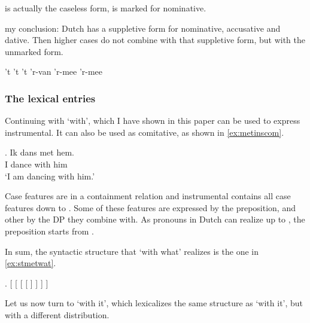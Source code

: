 \documentclass[12pt]{article}
\begin{document}
 is actually the caseless form,  is marked for nominative.


my conclusion: Dutch has a suppletive form for nominative, accusative and dative. Then higher cases do not combine with that suppletive form, but with the unmarked form.

't
't
't
'r-van
'r-mee
'r-mee



\subsubsection{The lexical entries}



Continuing with  `with', which I have shown in this paper can be used to express instrumental. It can also be used as comitative, as shown in \ref{ex:metinscom}.

\exg. Ik dans met hem.\\
 I dance with him\\
 `I am dancing with him.'\label{ex:metinscom}

Case features are in a containment relation and instrumental contains all case features down to . Some of these features are expressed by the preposition, and other by the DP they combine with. As pronouns in Dutch can realize up to , the preposition starts from .


In sum, the syntactic structure that  `with what' realizes is the one in \ref{ex:stmetwat}.

\ex. [ [ [ [  ]  ]  ]   ]\label{ex:stmetwat}

Let us now turn to  `with it', which lexicalizes the same structure as  `with it', but with a different distribution.
\end{document}
